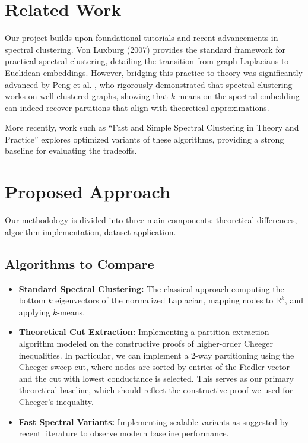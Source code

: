 \documentclass{article}
\begin{document}
\section{Related Work}
Our project builds upon foundational tutorials and recent advancements in spectral clustering. Von Luxburg (2007) \cite{luxburg2007tutorial} provides the standard framework for practical spectral clustering, detailing the transition from graph Laplacians to Euclidean embeddings. However, bridging this practice to theory was significantly advanced by Peng et al. \cite{peng2015partitioning}, who rigorously demonstrated that spectral clustering works on well-clustered graphs, showing that $k$-means on the spectral embedding can indeed recover partitions that align with theoretical approximations. 

More recently, work such as ``Fast and Simple Spectral Clustering in Theory and Practice'' \cite{bravo2023fast} explores optimized variants of these algorithms, providing a strong baseline for evaluating the tradeoffs.

\section{Proposed Approach}
Our methodology is divided into three main components: theoretical differences, algorithm implementation, dataset application.

\subsection{Algorithms to Compare}
\begin{itemize}
    \item \textbf{Standard Spectral Clustering:} The classical approach computing the bottom $k$ eigenvectors of the normalized Laplacian, mapping nodes to $\mathbb{R}^k$, and applying $k$-means.
    \item \textbf{Theoretical Cut Extraction:} Implementing a partition extraction algorithm modeled on the constructive proofs of higher-order Cheeger inequalities. In particular, we can implement a 2-way partitioning using the Cheeger sweep-cut, where nodes are sorted by entries of the Fiedler vector and the cut with lowest conductance is selected. This serves as our primary theoretical baseline, which should reflect the constructive proof we used for Cheeger's inequality.
    \item \textbf{Fast Spectral Variants:} Implementing scalable variants as suggested by recent literature to observe modern baseline performance.
\end{itemize}
\end{document}
